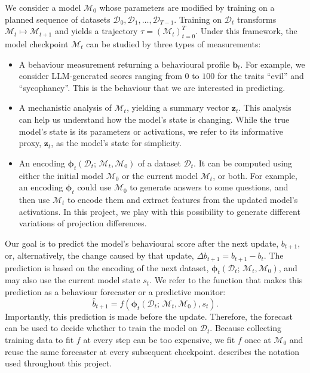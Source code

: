 We consider a model $\mathcal{M}_0$ whose parameters are modified by training on a planned sequence of datasets $\mathcal{D}_0, \mathcal{D}_1, \dots, \mathcal{D}_{T-1}$. Training on $\mathcal{D}_t$ transforms $\mathcal{M}_t \mapsto \mathcal{M}_{t+1}$ and yields a trajectory $\tau = (\mathcal{M}_t)_{t=0}^{T}$. Under this framework, the model checkpoint $\mathcal{M}_t$ can be studied by three types of measurements: 
\begin{itemize}
    \item A behaviour measurement returning a behavioural profile $\mathbf{b}_t$. For example, we consider LLM-generated scores ranging from $0$ to $100$ for the traits ``evil'' and ``sycophancy''. This is the behaviour that we are interested in predicting. 
    \item A mechanistic analysis of $\mathcal{M}_t$, yielding a summary vector $\mathbf{z}_t$. This analysis can help us understand how the model's state is changing. While the true model's state is its parameters or activations, we refer to its informative proxy, $\mathbf{z}_t$, as the model's state for simplicity.
    \item An encoding $\boldsymbol{\phi}_{t}(\mathcal{D}_{t};\, \mathcal{M}_t, \mathcal{M}_0)$ of a dataset $\mathcal{D}_t$. It can be computed using either the initial model $\mathcal{M}_0$ or the current model $\mathcal{M}_t$, or both. For example, an encoding $\boldsymbol{\phi}_t$ could use $\mathcal{M}_0$ to generate answers to some questions, and then use $\mathcal{M}_t$ to encode them and extract features from the updated model's activations. In this project, we play with this possibility to generate different variations of projection differences.
\end{itemize}
Our goal is to predict the model's behavioural score after the next update, $b_{t+1}$, or, alternatively, the change caused by that update, $\Delta b_{t+1}=b_{t+1}-b_t$. The prediction is based on the encoding of the next dataset, $\boldsymbol{\phi}_t(\mathcal{D}_t;\,\mathcal{M}_t,\mathcal{M}_0)$, and may also use the current model state $s_t$. We refer to the function that makes this prediction as a behaviour forecaster or a predictive monitor:
\begin{equation}
\widehat{b}_{t+1}
=
f\!\left(
\boldsymbol{\phi}_t(\mathcal{D}_t;\,\mathcal{M}_t,\mathcal{M}_0),
s_t
\right).
\label{eq:forecaster}
\end{equation}
Importantly, this prediction is made before the update. Therefore, the forecast can be used to decide whether to train the model on $\mathcal{D}_t$. Because collecting training data to fit $f$ at every step can be too expensive, we fit $f$ once at $\mathcal{M}_0$ and reuse the same forecaster at every subsequent checkpoint.  describes the notation used throughout this project.

